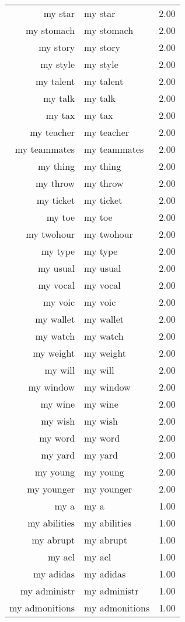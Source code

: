 \begin{table}[ht]
\begin{tabular}{rlr}
  my star & my star & 2.00 \\ 
  my stomach & my stomach & 2.00 \\ 
  my story & my story & 2.00 \\ 
  my style & my style & 2.00 \\ 
  my talent & my talent & 2.00 \\ 
  my talk & my talk & 2.00 \\ 
  my tax & my tax & 2.00 \\ 
  my teacher & my teacher & 2.00 \\ 
  my teammates & my teammates & 2.00 \\ 
  my thing & my thing & 2.00 \\ 
  my throw & my throw & 2.00 \\ 
  my ticket & my ticket & 2.00 \\ 
  my toe & my toe & 2.00 \\ 
  my twohour & my twohour & 2.00 \\ 
  my type & my type & 2.00 \\ 
  my usual & my usual & 2.00 \\ 
  my vocal & my vocal & 2.00 \\ 
  my voic & my voic & 2.00 \\ 
  my wallet & my wallet & 2.00 \\ 
  my watch & my watch & 2.00 \\ 
  my weight & my weight & 2.00 \\ 
  my will & my will & 2.00 \\ 
  my window & my window & 2.00 \\ 
  my wine & my wine & 2.00 \\ 
  my wish & my wish & 2.00 \\ 
  my word & my word & 2.00 \\ 
  my yard & my yard & 2.00 \\ 
  my young & my young & 2.00 \\ 
  my younger & my younger & 2.00 \\ 
  my a & my a & 1.00 \\ 
  my abilities & my abilities & 1.00 \\ 
  my abrupt & my abrupt & 1.00 \\ 
  my acl & my acl & 1.00 \\ 
  my adidas & my adidas & 1.00 \\ 
  my administr & my administr & 1.00 \\ 
  my admonitions & my admonitions & 1.00 \\ 

\end{tabular}
\end{table}

